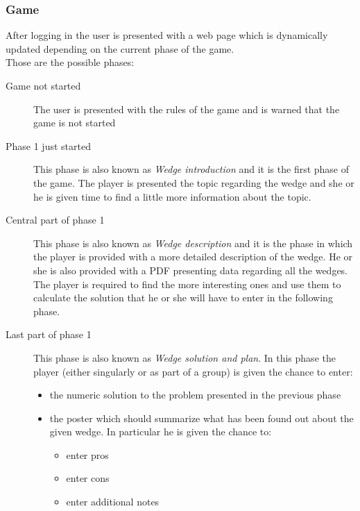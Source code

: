 \subsubsection{Game}
After logging in the user is presented with a web page which is dynamically updated depending on the current phase of the game.\\
Those are the possible phases:
\begin{description}
	\item[Game not started] The user is presented with the rules of the game and is warned that the game is not started
	\item[Phase 1 just started] This phase is also known as \emph{Wedge introduction} and it is the first phase of the game. The player is presented the topic regarding the wedge and she or he is given time to find a little more information about the topic.
	\item[Central part of phase 1] This phase is also known as \emph{Wedge description} and it is the phase in which the player is provided with a more detailed description of the wedge. He or she is also provided with a PDF presenting data regarding all the wedges. The player is required to find the more interesting ones and use them to calculate the solution that he or she will have to enter in the following phase. 
	\item[Last part of phase 1] This phase is also known as \emph{Wedge solution and plan}. In this phase the player (either singularly or as part of a group) is given the chance to enter:
	\begin{itemize}
	\item the numeric solution to the problem presented in the previous phase
	\item the poster which should summarize what has been found out about the given wedge. In particular he is given the chance to:
	\begin{itemize}
\item enter pros
\item enter cons
\item enter additional notes
\end{itemize}
\end{itemize}


\end{description}
